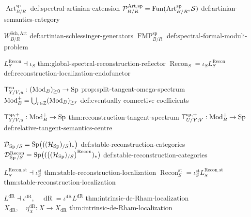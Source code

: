 \begin{longtable}

\NotationPair
{\(\operatorname{Art}^{\mathrm{sp}}_{B/R}\)}
{def:spectral-artinian-extension}
{\(\mathcal P^{\mathrm{Art},\mathrm{sp}}_{B/R}
  =\operatorname{Fun}(\operatorname{Art}^{\mathrm{sp}}_{B/R},\mathcal S)\)}
{def:artinian-semantics-category}

\NotationPair
{\(W^{\mathrm{Sch},\mathrm{Art}}_{B/R}\)}
{def:artinian-schlessinger-generators}
{\(\operatorname{FMP}^{\mathrm{sp}}_{B/R}\)}
{def:spectral-formal-moduli-problem}



\NotationPair
{\(L^{\mathrm{Recon}}_S\dashv\iota_S\)}
{thm:global-spectral-reconstruction-reflector}
{\(\operatorname{Recon}_S=\iota_SL^{\mathrm{Recon}}_S\)}
{def:reconstruction-localization-endofunctor}



\NotationPair
{\(\mathsf T^{\mathrm{cn}}_{Y/V,u}:
  (\operatorname{Mod}_B)_{\geq0}\to\operatorname{Sp}\)}
{prop:split-tangent-omega-spectrum}
{\(\operatorname{Mod}_B^+=\bigcup_{r\in\mathbb Z}(\operatorname{Mod}_B)_{\geq r}\)}
{def:eventually-connective-coefficients}

\NotationPair
{\(\mathsf T^{\mathrm{sp},+}_{Y/V,u}:\operatorname{Mod}_B^+\to\operatorname{Sp}\)}
{thm:reconstruction-tangent-spectrum}
{\(\mathsf T^{\mathrm{sp},+}_{U/Y;V}:\operatorname{Mod}_B^+\to\operatorname{Sp}\)}
{def:relative-tangent-semantics-centre}

\NotationPair
{\(\mathcal D_{\operatorname{Sp}/S}
  =\operatorname{Sp}\bigl(((\mathcal H_{\operatorname{Sp}})_{/S})_*\bigr)\)}
{def:stable-reconstruction-categories}
{\(\mathcal D^{\mathrm{Recon}}_{\operatorname{Sp}/S}
  =\operatorname{Sp}\bigl(
    (\bigl((\mathcal H_{\operatorname{Sp}})_{/S}\bigr)^{\mathrm{Recon}})_*
  \bigr)\)}
{def:stable-reconstruction-categories}

\NotationPair
{\(L^{\mathrm{Recon},\mathrm{st}}_S
  \dashv\iota^{\mathrm{st}}_S\)}
{thm:stable-reconstruction-localization}
{\(\operatorname{Recon}^{\mathrm{st}}_S
  =\iota^{\mathrm{st}}_SL^{\mathrm{Recon},\mathrm{st}}_S\)}
{thm:stable-reconstruction-localization}



\NotationPair
{\(L^{\mathrm{dR}}\dashv\iota^{\mathrm{dR}},\quad
  \operatorname{dR}=\iota^{\mathrm{dR}}L^{\mathrm{dR}}\)}
{thm:intrinsic-de-Rham-localization}
{\(X_{\mathrm{dR}},\quad \eta_X^{\mathrm{dR}}:X\to X_{\mathrm{dR}}\)}
{thm:intrinsic-de-Rham-localization}


\end{longtable}
